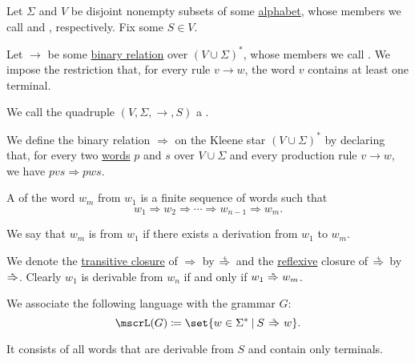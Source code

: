 \begin{definition}\label{def:formal_grammar}
  Let \( \Sigma \) and \( V \) be disjoint nonempty subsets of some \hyperref[def:formal_language]{alphabet}, whose members we call  and , respectively. Fix some  \( S \in V \).

  Let \( \to \) be some \hyperref[def:binary_relation]{binary relation} over \( (V \cup \Sigma)^* \), whose members we call . We impose the restriction that, for every rule \( v \to w \), the word \( v \) contains at least one terminal.

  We call the quadruple \( (V, \Sigma, \to, S) \) a .

  \begin{thmenum}
     We define the binary relation \( \Rightarrow \) on the Kleene star \( (V \cup \Sigma)^* \) by declaring that, for every two \hyperref[def:formal_language/word]{words} \( p \) and \( s \) over \( V \cup \Sigma \) and every production rule \( v \to w \), we have \( pvs \Rightarrow pws \).

    A  of the word \( w_m \) from \( w_1 \) is a finite sequence of words such that
    \begin{equation}\label{eq:def:formal_grammar/derivation}
      w_1
      \Rightarrow
      w_2
      \Rightarrow
      \cdots
      \Rightarrow
      w_{n-1}
      \Rightarrow
      w_m.
    \end{equation}

    We say that \( w_m \) is  from \( w_1 \) if there exists a derivation from \( w_1 \) to \( w_m \).

    We denote the \hyperref[def:relation_closures/transitive]{transitive closure} of \( \Rightarrow \) by \( \reloset + \Rightarrow \) and the \hyperref[def:relation_closures/reflexive]{reflexive} closure of \( \reloset + \Rightarrow \) by \( \reloset {*} \Rightarrow \). Clearly \( w_1 \) is derivable from \( w_n \) if and only if \( w_1 \reloset {*} \Rightarrow w_m \).

     We associate the following language with the grammar \( G \):
    \begin{equation*}
      \mscrL(G) \coloneqq \set{ w \in \Sigma^* \given S \reloset + \Rightarrow w }.
    \end{equation*}

    It consists of all words that are derivable from \( S \) and contain only terminals.


\end{thmenum}
\end{definition}
